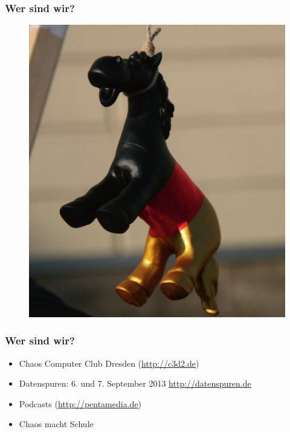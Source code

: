 \documentclass[12pt]{beamer}
\begin{document}
\begin{frame}
  \frametitle{Wer sind wir?}
  \begin{figure}
    \includegraphics[height=0.7\textheight]{img/trojaner.jpg}
  \end{figure}
\end{frame}

\begin{frame}
    \frametitle{Wer sind wir?}
    \begin{itemize}
      \item<1-> Chaos Computer Club Dresden (\url{http://c3d2.de})
          \note{}
      \item<2-> Datenspuren: 6. und 7. September 2013 \url{http://datenspuren.de}
      \item<3-> Podcasts (\url{http://pentamedia.de})
      \item<4-> Chaos macht Schule
    \end{itemize}
\end{frame}
\end{document}
